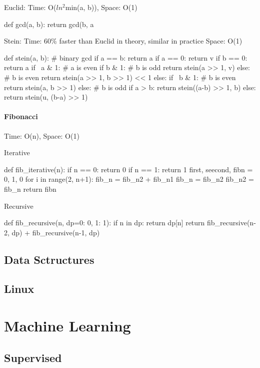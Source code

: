 \documentclass[11pt]{article}
\begin{document}
Euclid: Time: O($ln^2$min(a, b)), Space: O(1)
\begin{python}
def gcd(a, b):
    return gcd(b, a %
\end{python}

Stein: Time: 60\% faster than Euclid in theory, similar in practice Space: O(1)
\begin{python}
def stein(a, b):
    # binary gcd
    if a == b: return a
    if a == 0: return v
    if b == 0: return a
    if ~a & 1: # a is even
        if b & 1: # b is odd
            return stein(a >> 1, v)
        else: # b is even
            return stein(a >> 1, b >> 1) << 1
    else:
        if ~b & 1: # b is even
            return stein(a, b >> 1)
        else: # b is odd
            if a > b:
                return stein((a-b) >> 1, b)
            else:
                return stein(u, (b-a) >> 1)
\end{python}


\paragraph{Fibonacci} Time: O(n), Space: O(1)

Iterative
\begin{python}
def fib_iterative(n):
    if n == 0: return 0
    if n == 1: return 1
    first, seecond, fibn = 0, 1, 0
    for i in range(2, n+1):
      fib_n = fib_n2 + fib_n1
      fib_n = fib_n2
      fib_n2 = fib_n
    return fibn
\end{python}

Recursive
\begin{python}
def fib_recursive(n, dp={0: 0, 1: 1}):
    if n in dp:
        return dp[n]
    return fib_recursive(n-2, dp) + fib_recursive(n-1, dp)
\end{python}


\subsection{Data Sctructures}

\subsection{Linux}

\section{Machine Learning}
\subsection{Supervised}
\end{document}
